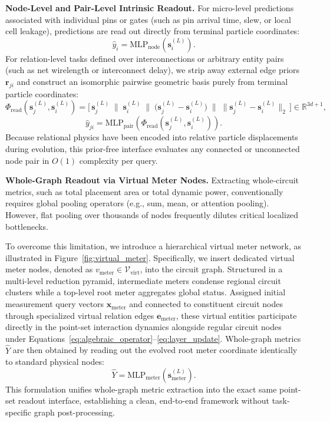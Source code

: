 \textbf{Node-Level and Pair-Level Intrinsic Readout.} For micro-level predictions associated with individual pins or gates (such as pin arrival time, slew, or local cell leakage), predictions are read out directly from terminal particle coordinates:
\begin{equation}
    \hat{y}_i = \text{MLP}_{\text{node}}\left(\mathbf{s}_i^{(L)}\right).
    \label{eq:readout_node}
\end{equation}
For relation-level tasks defined over interconnections or arbitrary entity pairs (such as net wirelength or interconnect delay), we strip away external edge priors $\mathbf{r}_{ji}$ and construct an isomorphic pairwise geometric basis purely from terminal particle coordinates:
\begin{equation}
    \Phi_{\text{read}}\left(\mathbf{s}_j^{(L)}, \mathbf{s}_i^{(L)}\right) = \Big[\, \mathbf{s}_j^{(L)} \;\|\; \mathbf{s}_i^{(L)} \;\|\; \big(\mathbf{s}_j^{(L)} - \mathbf{s}_i^{(L)}\big) \;\|\; \big\|\mathbf{s}_j^{(L)} - \mathbf{s}_i^{(L)}\big\|_2 \,\Big] \in \mathbb{R}^{3d + 1},
    \label{eq:readout_basis}
\end{equation}
\begin{equation}
    \hat{y}_{ji} = \text{MLP}_{\text{pair}}\left(\Phi_{\text{read}}\left(\mathbf{s}_j^{(L)}, \mathbf{s}_i^{(L)}\right)\right).
    \label{eq:readout_pair}
\end{equation}
Because relational physics have been encoded into relative particle displacements during evolution, this prior-free interface evaluates any connected or unconnected node pair in $O(1)$ complexity per query.

\textbf{Whole-Graph Readout via Virtual Meter Nodes.} Extracting whole-circuit metrics, such as total placement area or total dynamic power, conventionally requires global pooling operators (e.g., sum, mean, or attention pooling). However, flat pooling over thousands of nodes frequently dilutes critical localized bottlenecks.

To overcome this limitation, we introduce a hierarchical virtual meter network, as illustrated in Figure~\ref{fig:virtual_meter}. Specifically, we insert dedicated virtual meter nodes, denoted as $v_{\text{meter}} \in \mathcal{V}_{\text{virt}}$, into the circuit graph. Structured in a multi-level reduction pyramid, intermediate meters condense regional circuit clusters while a top-level root meter aggregates global status. Assigned initial measurement query vectors $\mathbf{x}_{\text{meter}}$ and connected to constituent circuit nodes through specialized virtual relation edges $\mathbf{e}_{\text{meter}}$, these virtual entities participate directly in the point-set interaction dynamics alongside regular circuit nodes under Equations~\eqref{eq:algebraic_operator}--\eqref{eq:layer_update}. Whole-graph metrics $\hat{Y}$ are then obtained by reading out the evolved root meter coordinate identically to standard physical nodes:
\begin{equation}
    \hat{Y} = \text{MLP}_{\text{meter}}\left(\mathbf{s}_{\text{meter}}^{(L)}\right).
    \label{eq:readout_graph}
\end{equation}
This formulation unifies whole-graph metric extraction into the exact same point-set readout interface, establishing a clean, end-to-end framework without task-specific graph post-processing.
